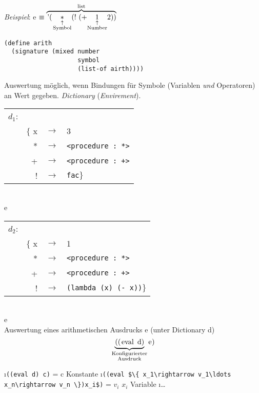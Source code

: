 \emph{Beispiel}: e $\equiv \overbrace{\text{\lstinline[mathescape]|'($\underset{\substack{\uparrow\\\text{Symbol}}}{*}
$(! (+ $\underset{\substack{\uparrow\\\text{Number}}}{1}$ 2))|}}^{\text{list}}$\\
\begin{lstlisting}
(define arith
  (signature (mixed number
                    symbol
                    (list-of airth))))
\end{lstlisting}
Auswertung möglich, wenn Bindungen für Symbole (Variablen \emph{und} Operatoren) an Wert gegeben. \emph{Dictionary} (\emph{Envirement}).\\
\begin{tabular}{lrcl}
$d_1$:\\
&$\lbrace$ x&$\rightarrow$& 3\\
&*&$\rightarrow$& \lstinline|<procedure : *>|\\
&+&$\rightarrow$& \lstinline|<procedure : +>|\\
&!&$\rightarrow$& \lstinline|fac|$\rbrace$\\
\end{tabular}\\
e\\
\begin{tabular}{lrcl}
$d_2$:\\
&$\lbrace$ x&$\rightarrow$& 1\\
&*&$\rightarrow$& \lstinline|<procedure : *>|\\
&+&$\rightarrow$& \lstinline|<procedure : +>|\\
&!&$\rightarrow$& \lstinline|(lambda (x) (- x))|$\rbrace$\\
\end{tabular}\\
e\\
Auswertung eines arithmetischen Ausdrucks e (unter Dictionary d)
\[ \underbrace{\text{\lstinline|((eval d) |}}_{\substack{\text{Konfigurierter}\\\text{Ausdruck}}}\text{\lstinline|e)|} \]
\begin{enumerate}[(E1)]
\i \lstinline|((eval d) c)| = c \hfill Konstante
\i \lstinline[mathescape]|((eval $\{ x_1\rightarrow v_1\ldots x_n\rightarrow v_n \})x_i$)| = $v_i$ \hfill $x_i$ Variable
\i \ldots
\end{enumerate}